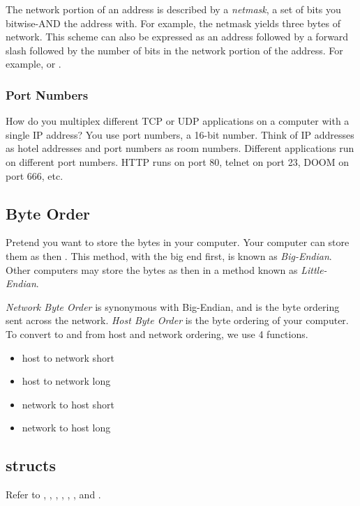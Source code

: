 The network portion of an address is described by a \emph{netmask}, a set of bits you bitwise-AND the address with. For example, the netmask  yields three bytes of network. This scheme can also be expressed as an address followed by a forward slash followed by the number of bits in the network portion of the address. For example,  or .

\subsubsection{Port Numbers}
How do you multiplex different TCP or UDP applications on a computer with a single IP address? You use port numbers, a 16-bit number. Think of IP addresses as hotel addresses and port numbers as room numbers. Different applications run on different port numbers. HTTP runs on port 80, telnet on port 23, DOOM on port 666, etc.

\subsection{Byte Order}
Pretend you want to store the bytes  in your computer. Your computer can store them as  then . This method, with the big end first, is known as \emph{Big-Endian}. Other computers may store the bytes as  then  in a method known as \emph{Little-Endian}.

\emph{Network Byte Order} is synonymous with Big-Endian, and is the byte ordering sent across the network. \emph{Host Byte Order} is the byte ordering of your computer. To convert to and from host and network ordering, we use 4 functions.
\begin{itemize}
  \item {} host to network short
  \item {} host to network long
  \item {} network to host short
  \item {} network to host long
\end{itemize}

\subsection{structs}
Refer to , , , , , , and .


